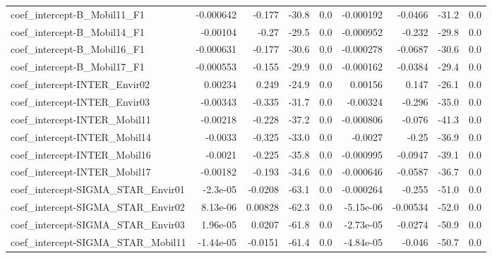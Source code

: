 \begin{tabular}{lrrrrrrrr}
coef\_intercept-B\_Mobil11\_F1               &   -0.000642 &       -0.177 &   -30.8 &      0.0 &  -0.000192 &     -0.0466 &        -31.2 &           0.0 \\
coef\_intercept-B\_Mobil14\_F1               &    -0.00104 &        -0.27 &   -29.5 &      0.0 &  -0.000952 &      -0.232 &        -29.8 &           0.0 \\
coef\_intercept-B\_Mobil16\_F1               &   -0.000631 &       -0.177 &   -30.6 &      0.0 &  -0.000278 &     -0.0687 &        -30.6 &           0.0 \\
coef\_intercept-B\_Mobil17\_F1               &   -0.000553 &       -0.155 &   -29.9 &      0.0 &  -0.000162 &     -0.0384 &        -29.4 &           0.0 \\
coef\_intercept-INTER\_Envir02              &     0.00234 &        0.249 &   -24.9 &      0.0 &    0.00156 &       0.147 &        -26.1 &           0.0 \\
coef\_intercept-INTER\_Envir03              &    -0.00343 &       -0.335 &   -31.7 &      0.0 &   -0.00324 &      -0.296 &        -35.0 &           0.0 \\
coef\_intercept-INTER\_Mobil11              &    -0.00218 &       -0.228 &   -37.2 &      0.0 &  -0.000806 &      -0.076 &        -41.3 &           0.0 \\
coef\_intercept-INTER\_Mobil14              &     -0.0033 &       -0.325 &   -33.0 &      0.0 &    -0.0027 &       -0.25 &        -36.9 &           0.0 \\
coef\_intercept-INTER\_Mobil16              &     -0.0021 &       -0.225 &   -35.8 &      0.0 &  -0.000995 &     -0.0947 &        -39.1 &           0.0 \\
coef\_intercept-INTER\_Mobil17              &    -0.00182 &       -0.193 &   -34.6 &      0.0 &  -0.000646 &     -0.0587 &        -36.7 &           0.0 \\
coef\_intercept-SIGMA\_STAR\_Envir01         &    -2.3e-05 &      -0.0208 &   -63.1 &      0.0 &  -0.000264 &      -0.255 &        -51.0 &           0.0 \\
coef\_intercept-SIGMA\_STAR\_Envir02         &    8.13e-06 &      0.00828 &   -62.3 &      0.0 &  -5.15e-06 &    -0.00534 &        -52.0 &           0.0 \\
coef\_intercept-SIGMA\_STAR\_Envir03         &    1.96e-05 &       0.0207 &   -61.8 &      0.0 &  -2.73e-05 &     -0.0274 &        -50.9 &           0.0 \\
coef\_intercept-SIGMA\_STAR\_Mobil11         &   -1.44e-05 &      -0.0151 &   -61.4 &      0.0 &  -4.84e-05 &      -0.046 &        -50.7 &           0.0 \\

\end{tabular}

